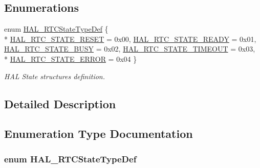 \subsection*{Enumerations}
\begin{DoxyCompactItemize}
\item 
enum \hyperlink{group___r_t_c___exported___types_ga1e2460a2d13c4efc7a2a1ab2a1ebd32b}{H\+A\+L\+\_\+\+R\+T\+C\+State\+Type\+Def} \{ \\*
\hyperlink{group___r_t_c___exported___types_gga1e2460a2d13c4efc7a2a1ab2a1ebd32ba69cd05758f5129525749b65bee6f939f}{H\+A\+L\+\_\+\+R\+T\+C\+\_\+\+S\+T\+A\+T\+E\+\_\+\+R\+E\+S\+ET} = 0x00, 
\hyperlink{group___r_t_c___exported___types_gga1e2460a2d13c4efc7a2a1ab2a1ebd32ba466484cd22333d8c8758ae12890b862f}{H\+A\+L\+\_\+\+R\+T\+C\+\_\+\+S\+T\+A\+T\+E\+\_\+\+R\+E\+A\+DY} = 0x01, 
\hyperlink{group___r_t_c___exported___types_gga1e2460a2d13c4efc7a2a1ab2a1ebd32ba5e0a8c8e4731ac8f80e9a219413d6f9b}{H\+A\+L\+\_\+\+R\+T\+C\+\_\+\+S\+T\+A\+T\+E\+\_\+\+B\+U\+SY} = 0x02, 
\hyperlink{group___r_t_c___exported___types_gga1e2460a2d13c4efc7a2a1ab2a1ebd32ba062e7947b5f5f0c2acb7be96207e3d58}{H\+A\+L\+\_\+\+R\+T\+C\+\_\+\+S\+T\+A\+T\+E\+\_\+\+T\+I\+M\+E\+O\+UT} = 0x03, 
\\*
\hyperlink{group___r_t_c___exported___types_gga1e2460a2d13c4efc7a2a1ab2a1ebd32ba21f381f99f437c340f79407e3d71bb31}{H\+A\+L\+\_\+\+R\+T\+C\+\_\+\+S\+T\+A\+T\+E\+\_\+\+E\+R\+R\+OR} = 0x04
 \}\begin{DoxyCompactList}\small\item\em H\+AL State structures definition. \end{DoxyCompactList}
\end{DoxyCompactItemize}


\subsection{Detailed Description}


\subsection{Enumeration Type Documentation}
\subsubsection[{\texorpdfstring{H\+A\+L\+\_\+\+R\+T\+C\+State\+Type\+Def}{HAL_RTCStateTypeDef}}]{\setlength{\rightskip}{0pt plus 5cm}enum {\bf H\+A\+L\+\_\+\+R\+T\+C\+State\+Type\+Def}}\hypertarget{group___r_t_c___exported___types_ga1e2460a2d13c4efc7a2a1ab2a1ebd32b}{}\label{group___r_t_c___exported___types_ga1e2460a2d13c4efc7a2a1ab2a1ebd32b}


